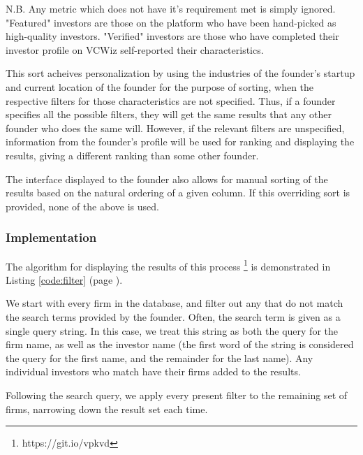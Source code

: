 N.B. Any metric which does not have it's requirement met is simply ignored. "Featured" investors are those on the platform who have been hand-picked as high-quality investors. "Verified" investors are those who have completed their investor profile on VCWiz self-reported their characteristics.

This sort acheives personalization by using the industries of the founder's startup and current location of the founder for the purpose of sorting, when the respective filters for those characteristics are not specified. Thus, if a founder specifies all the possible filters, they will get the same results that any other founder who does the same will. However, if the relevant filters are unspecified, information from the founder's profile will be used for ranking and displaying the results, giving a different ranking than some other founder.

The interface displayed to the founder also allows for manual sorting of the results based on the natural ordering of a given column. If this overriding sort is provided, none of the above is used.

\subsubsection{Implementation}

The algorithm for displaying the results of this process \footnote{https://git.io/vpkvd} is demonstrated in Listing \ref{code:filter} (page \pageref{code:filter}).

We start with every firm in the database, and filter out any that do not match the search terms provided by the founder. Often, the search term is given as a single query string. In this case, we treat this string as both the query for the firm name, as well as the investor name (the first word of the string is considered the query for the first name, and the remainder for the last name). Any individual investors who match have their firms added to the results.

Following the search query, we apply every present filter to the remaining set of firms, narrowing down the result set each time.

